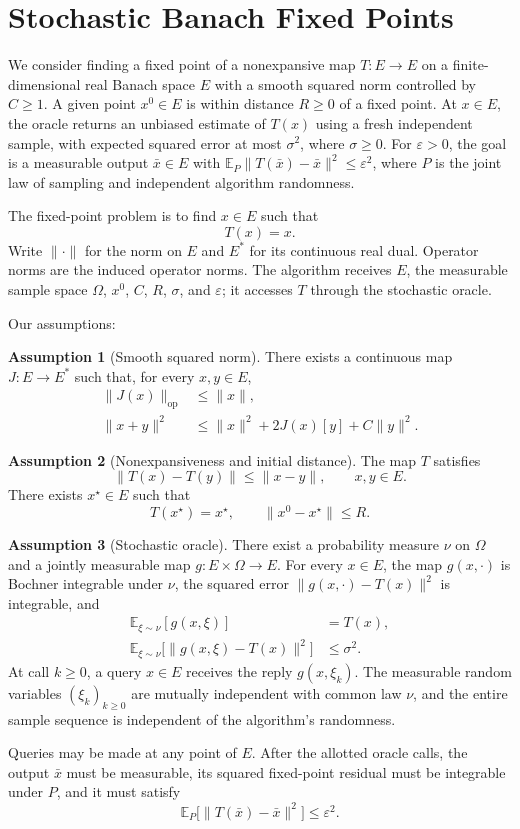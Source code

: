 \documentclass[10pt]{article}
\theoremstyle{definition}
\newtheorem{assumption}{Assumption}
\begin{document}
\section*{Stochastic Banach Fixed Points}
We consider finding a fixed point of a nonexpansive map $T:E\to E$ on a finite-dimensional real Banach space $E$ with a smooth squared norm controlled by $C\geq1$. A given point $x^0\in E$ is within distance $R\geq0$ of a fixed point. At $x\in E$, the oracle returns an unbiased estimate of $T(x)$ using a fresh independent sample, with expected squared error at most $\sigma^2$, where $\sigma\geq0$. For $\varepsilon>0$, the goal is a measurable output $\bar{x}\in E$ with $\mathbb{E}_{P}\|T(\bar{x})-\bar{x}\|^2\leq\varepsilon^2$, where $P$ is the joint law of sampling and independent algorithm randomness.

The fixed-point problem is to find $x\in E$ such that
\[
T(x)=x.
\]
Write $\|\cdot\|$ for the norm on $E$ and $E^*$ for its continuous real dual. Operator norms are the induced operator norms. The algorithm receives $E$, the measurable sample space $\Omega$, $x^0$, $C$, $R$, $\sigma$, and $\varepsilon$; it accesses $T$ through the stochastic oracle.

Our assumptions:
\begin{assumption}[Smooth squared norm]
There exists a continuous map $J:E\to E^*$ such that, for every $x,y\in E$,
\[
\begin{aligned}
\|J(x)\|_{\mathrm{op}}&\leq\|x\|,\\
\|x+y\|^2&\leq\|x\|^2+2J(x)[y]+C\|y\|^2.
\end{aligned}
\]
\end{assumption}

\begin{assumption}[Nonexpansiveness and initial distance]
The map $T$ satisfies
\[
\|T(x)-T(y)\|\leq\|x-y\|,
\qquad x,y\in E.
\]
There exists $x^\star\in E$ such that
\[
T(x^\star)=x^\star,
\qquad \|x^0-x^\star\|\leq R.
\]
\end{assumption}

\begin{assumption}[Stochastic oracle]
There exist a probability measure $\nu$ on $\Omega$ and a jointly measurable map $g:E\times\Omega\to E$. For every $x\in E$, the map $g(x,\cdot)$ is Bochner integrable under $\nu$, the squared error $\|g(x,\cdot)-T(x)\|^2$ is integrable, and
\[
\begin{aligned}
\mathbb{E}_{\xi\sim\nu}[g(x,\xi)]&=T(x),\\
\mathbb{E}_{\xi\sim\nu}\bigl[\|g(x,\xi)-T(x)\|^2\bigr]&\leq\sigma^2.
\end{aligned}
\]
At call $k\geq0$, a query $x\in E$ receives the reply $g(x,\xi_k)$. The measurable random variables $(\xi_k)_{k\geq0}$ are mutually independent with common law $\nu$, and the entire sample sequence is independent of the algorithm's randomness.
\end{assumption}

Queries may be made at any point of $E$. After the allotted oracle calls, the output $\bar{x}$ must be measurable, its squared fixed-point residual must be integrable under $P$, and it must satisfy
\[
\mathbb{E}_{P}\bigl[\|T(\bar{x})-\bar{x}\|^2\bigr]
\leq\varepsilon^2.
\]
\end{document}
